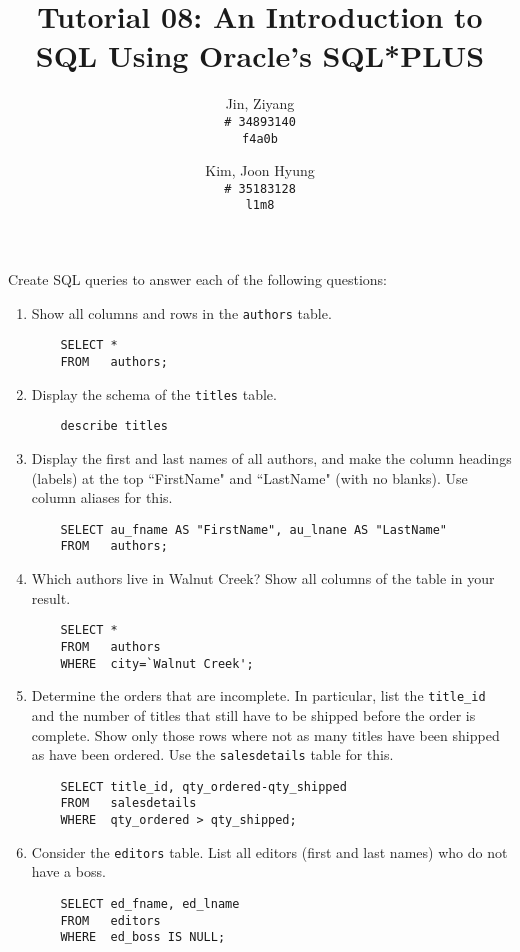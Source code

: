 \documentclass{article}
\title{Tutorial 08: An Introduction to SQL Using Oracle's SQL*PLUS}
\author{
	Jin, Ziyang\\
	\texttt{\# 34893140}\\
	\texttt{f4a0b}
	\and
	Kim, Joon Hyung\\
	\texttt{\# 35183128}\\
	\texttt{l1m8}
}
\begin{document}
	\maketitle

\noindent Create SQL queries to answer each of the following questions:

\begin{enumerate}
\item Show all columns and rows in the \texttt{authors} table.
	\begin{verbatim}
	SELECT *
	FROM   authors;
	\end{verbatim}

\item Display the schema of the \texttt{titles} table.
	\begin{verbatim}
	describe titles
	\end{verbatim}
	
\item Display the first and last names of all authors, and make the column headings (labels) at the top ``FirstName" and ``LastName" (with no blanks). Use column aliases for this.
	\begin{verbatim}
	SELECT au_fname AS "FirstName", au_lnane AS "LastName"
	FROM   authors;
	\end{verbatim}

\item Which authors live in Walnut Creek? Show all columns of the table in your result.
	\begin{verbatim}
	SELECT *
	FROM   authors
	WHERE  city=`Walnut Creek';
	\end{verbatim}
	
\item Determine the orders that are incomplete. In particular, list the \texttt{title\_id} and the number of titles that still have to be shipped before the order is complete. Show only those rows where not as many titles have been shipped as have been ordered. Use the \texttt{salesdetails} table for this.
	\begin{verbatim}
	SELECT title_id, qty_ordered-qty_shipped
	FROM   salesdetails
	WHERE  qty_ordered > qty_shipped;
	\end{verbatim}

\item Consider the \texttt{editors} table. List all editors (first and last names) who do not have a boss.
	\begin{verbatim}
	SELECT ed_fname, ed_lname
	FROM   editors
	WHERE  ed_boss IS NULL;
	\end{verbatim}


\end{enumerate}
\end{document}

